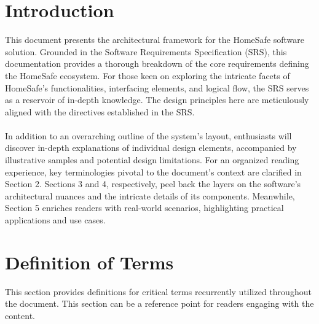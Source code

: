 \documentclass{article}
\begin{document}
\section{Introduction}
This document presents the architectural framework for the HomeSafe software solution. Grounded in the Software Requirements Specification (SRS), this documentation provides a thorough breakdown of the core requirements defining the HomeSafe ecosystem. For those keen on exploring the intricate facets of HomeSafe's functionalities, interfacing elements, and logical flow, the SRS serves as a reservoir of in-depth knowledge. The design principles here are meticulously aligned with the directives established in the SRS. \\ \\
In addition to an overarching outline of the system's layout, enthusiasts will discover in-depth explanations of individual design elements, accompanied by illustrative samples and potential design limitations. For an organized reading experience, key terminologies pivotal to the document's context are clarified in Section 2. Sections 3 and 4, respectively, peel back the layers on the software's architectural nuances and the intricate details of its components. Meanwhile, Section 5 enriches readers with real-world scenarios, highlighting practical applications and use cases.

\section{Definition of Terms}
This section provides definitions for critical terms recurrently utilized throughout the document. This section can be a reference point for readers engaging with the content.
\end{document}
